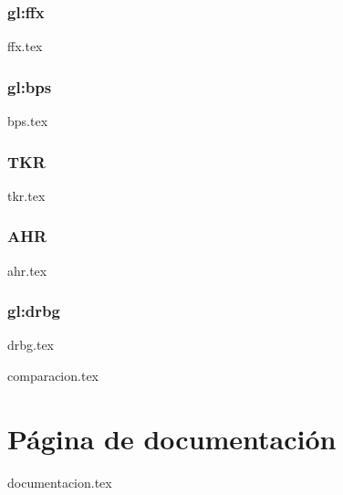 \subsubsection{\texorpdfstring{\acrshort{gl:ffx}}{FFX}}
{ffx.tex}

\subsubsection{\texorpdfstring{\acrshort{gl:bps}}{BPS}}
{bps.tex}

\subsubsection{TKR}
{tkr.tex}

\subsubsection{AHR}
{ahr.tex}

\subsubsection{\texorpdfstring{\acrshort{gl:drbg}}{DRBG}}
{drbg.tex}

{comparacion.tex}

\section{Página de documentación}
{documentacion.tex}
